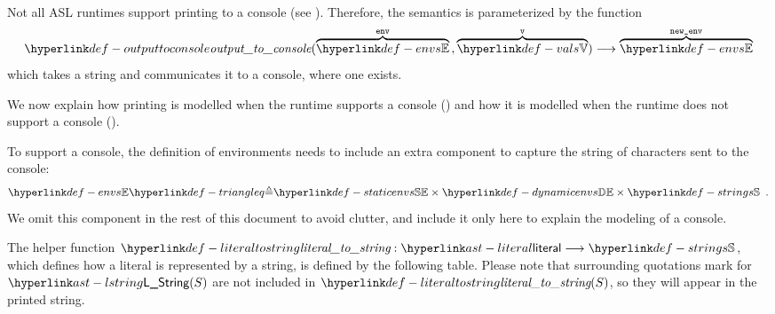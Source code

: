 \FormallyParagraph
\begin{mathpar}
\end{mathpar}

\begin{mathpar}
\end{mathpar}

Not all ASL runtimes support printing to a console (see ).
%
Therefore, the semantics is parameterized by the function
\hypertarget{def-outputtoconsole}{}
\[
\outputtoconsole(\overname{\envs}{\env} \aslsep \overname{\vals}{\vv}) \aslto
  \overname{\envs}{\newenv}
\]
which takes a string and communicates it to a console, where one exists.

We now explain how printing is modelled when the runtime supports a console
()
and how it is modelled when the runtime does not support a console
().

To support a console, the definition of environments needs
to include an extra component to capture the string of characters sent to the console:
\[
\envs \triangleq \staticenvs \times \dynamicenvs \times \Strings \enspace.
\]
We omit this component in the rest of this document to avoid clutter, and include it
only here to explain the modeling of a console.

\hypertarget{def-literaltostring}{}
The helper function $\literaltostring : \literal \aslto \Strings$,
which defines how a literal is represented by a string,
is defined by the following table.
%
Please note that surrounding quotations mark for $\lstring(S)$ are not included
in $\literaltostring(S)$, so they will appear in the printed string.


